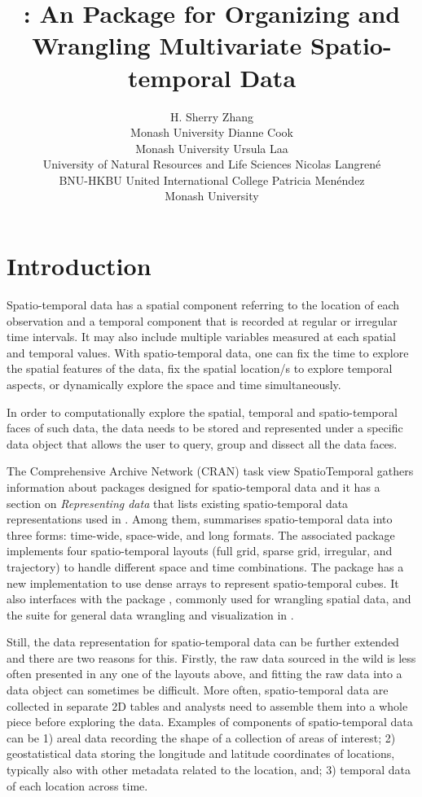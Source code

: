 \documentclass[
  shortnames]{jss}
\author{
H. Sherry Zhang\\Monash University \And Dianne Cook\\Monash University \AND Ursula Laa\\University of Natural Resources and Life Sciences \AND Nicolas Langrené\\BNU-HKBU United International College \And Patricia Menéndez\\Monash University
}
\title{\pkg{cubble}: An \proglang{R} Package for Organizing and Wrangling Multivariate Spatio-temporal Data}
\begin{document}
\newpage

\hypertarget{introduction}{%
\section{Introduction}\label{introduction}}

Spatio-temporal data has a spatial component referring to the location of each observation and a temporal component that is recorded at regular or irregular time intervals. It may also include multiple variables measured at each spatial and temporal values. With spatio-temporal data, one can fix the time to explore the spatial features of the data, fix the spatial location/s to explore temporal aspects, or dynamically explore the space and time simultaneously.

In order to computationally explore the spatial, temporal and spatio-temporal faces of such data, the data needs to be stored and represented under a specific data object that allows the user to query, group and dissect all the data faces.

The Comprehensive  Archive Network (CRAN) task view SpatioTemporal \citep{ctvspatiotemporal} gathers information about  packages designed for spatio-temporal data and it has a section on \emph{Representing data} that lists existing spatio-temporal data representations used in . Among them, \citet{spacetime} summarises spatio-temporal data into three forms: time-wide, space-wide, and long formats. The associated package  \citep{spacetime} implements four spatio-temporal layouts (full grid, sparse grid, irregular, and trajectory) to handle different space and time combinations. The package  \citep{stars} has a new implementation to use dense arrays to represent spatio-temporal cubes. It also interfaces with the package  \citep{sf}, commonly used for wrangling spatial data, and the  \citep{tidyverse} suite for general data wrangling and visualization in .

Still, the data representation for spatio-temporal data can be further extended and there are two reasons for this. Firstly, the raw data sourced in the wild is less often presented in any one of the layouts above, and fitting the raw data into a data object can sometimes be difficult. More often, spatio-temporal data are collected in separate 2D tables and analysts need to assemble them into a whole piece before exploring the data. Examples of components of spatio-temporal data can be 1) areal data recording the shape of a collection of areas of interest; 2) geostatistical data storing the longitude and latitude coordinates of locations, typically also with other metadata related to the location, and; 3) temporal data of each location across time.
\end{document}

